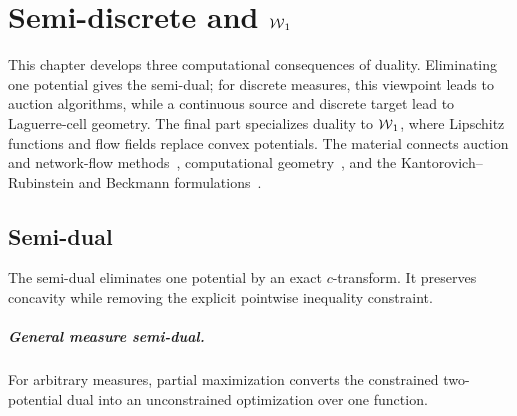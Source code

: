
\chapter[Semi-discrete and W1]{Semi-discrete and $\operatorname{\mathcal{W}}_1$}
\label{sec-semidiscr-w1}

This chapter develops three computational consequences of duality. Eliminating one potential gives the semi-dual; for discrete measures, this viewpoint leads to auction algorithms, while a continuous source and discrete target lead to Laguerre-cell geometry. The final part specializes duality to $\operatorname{\mathcal{W}}_1$, where Lipschitz functions and flow fields replace convex potentials. The material connects auction and network-flow methods~\cite{bertsekas1992auction,bertsekas1988dual}, computational geometry~\cite{AurenhammerHA98,Merigot11,merigot2013comparison}, and the Kantorovich--Rubinstein and Beckmann formulations~\cite{kantorovich1958space,Beckmann52}.

\section{Semi-dual}\label{sec-semi-dual}

The semi-dual eliminates one potential by an exact $c$-transform. It preserves concavity while removing the explicit pointwise inequality constraint.

\paragraph{General measure semi-dual.}
For arbitrary measures, partial maximization converts the constrained two-potential dual into an unconstrained optimization over one function.

